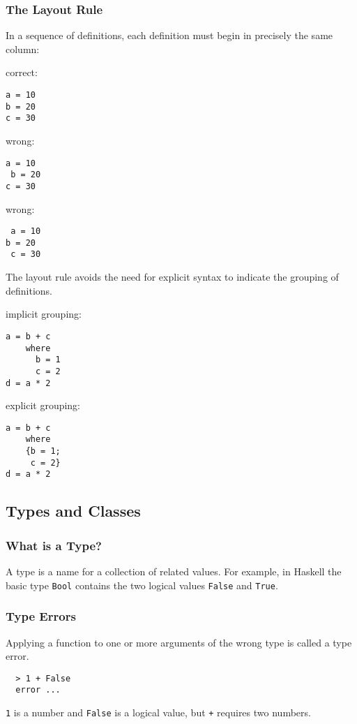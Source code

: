 \begin{multicols}{2}
\subsubsection{The Layout Rule}
In a sequence of definitions, each definition must begin in precisely the same column:
\begin{multicols}{3}
correct:
\begin{lstlisting}
a = 10
b = 20
c = 30
\end{lstlisting}
\vfill\null
\columnbreak
wrong:
\begin{lstlisting}
a = 10
 b = 20
c = 30
\end{lstlisting}
\vfill\null
\columnbreak
wrong:
\begin{lstlisting}
 a = 10
b = 20
 c = 30
\end{lstlisting}
\vfill\null
\end{multicols}
The layout rule avoids the need for explicit syntax to indicate the grouping of definitions.
\begin{multicols}{2}
implicit grouping:
\begin{lstlisting}
a = b + c
    where
      b = 1
      c = 2
d = a * 2
\end{lstlisting}
\vfill\null
\columnbreak
explicit grouping:
\begin{lstlisting}
a = b + c
    where
    {b = 1;
     c = 2}
d = a * 2
\end{lstlisting}
\vfill\null
\end{multicols}

\subsection{Types and Classes}
\subsubsection{What is a Type?}
A type is a name for a collection of related values.
For example, in Haskell the basic type \lstinline{Bool} contains the two logical values \lstinline{False} and \lstinline{True}.

\subsubsection{Type Errors}
Applying a function to one or more arguments of the wrong type is called a type error.
\begin{multicols}{2}
  \begin{lstlisting}
  > 1 + False
  error ...
  \end{lstlisting}
  \lstinline{1} is a number and \lstinline{False} is a logical value, but \lstinline{+} requires two numbers.
\end{multicols}


\end{multicols}
